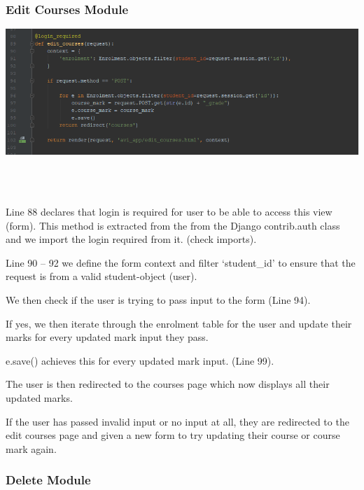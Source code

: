 \documentclass[10pt]{article}
\begin{document}
\subsubsection{Edit Courses Module}

\begin{center}
\includegraphics[width=1.1\textwidth]{p10.png}
\end{center} \\ \\

\begin{description}[font=$\bullet$~\normalfont\scshape\color{red!50!black}]
\item [] Line 88 declares that login is required for user to be able to access this view (form). This method is extracted from the  from the Django contrib.auth class and we import the login required from it. (check imports).
\item [] Line 90 – 92 we define the form context and filter ‘student\_id’ to ensure that the request is from a valid student-object (user). 
\item [] We then check if the user is trying to pass input to the form (Line 94).
\item [] If yes, we then iterate through the enrolment table for the user and update their marks for every updated mark input they pass.
\item [] e.save() achieves this for every updated mark input. (Line 99).
\item [] The user is then redirected to the courses page which now displays all their updated marks.
\item [] If the user has passed invalid input or no input at all, they are redirected to the edit courses page and given a new form to try updating their course or course mark again.

\end{description}

\subsubsection{Delete  Module}
\end{document}
